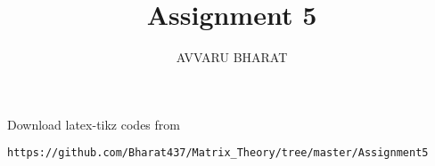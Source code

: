 \documentclass[journal,12pt,twocolumn]{IEEEtran}
\DeclareMathOperator*{\Res}{Res}
\begin{document}
\newtheorem{theorem}{Theorem}[section]
\newtheorem{problem}{Problem}
\newtheorem{proposition}{Proposition}[section]
\newtheorem{lemma}{Lemma}[section]
\newtheorem{corollary}[theorem]{Corollary}
\newtheorem{example}{Example}[section]
\newtheorem{definition}[problem]{Definition}

\newcommand{\BEQA}{\begin{eqnarray}}
\newcommand{\EEQA}{\end{eqnarray}}
\newcommand{\define}{\stackrel{\triangle}{=}}

\providecommand{\mbf}{\mathbf}
\providecommand{\pr}[1]{\ensuremath{\Pr\left(#1\right)}}
\providecommand{\qfunc}[1]{\ensuremath{Q\left(#1\right)}}
\providecommand{\sbrak}[1]{\ensuremath{{}\left[#1\right]}}
\providecommand{\lsbrak}[1]{\ensuremath{{}\left[#1\right.}}
\providecommand{\rsbrak}[1]{\ensuremath{{}\left.#1\right]}}
\providecommand{\brak}[1]{\ensuremath{\left(#1\right)}}
\providecommand{\lbrak}[1]{\ensuremath{\left(#1\right.}}
\providecommand{\rbrak}[1]{\ensuremath{\left.#1\right)}}
\providecommand{\cbrak}[1]{\ensuremath{\left\{#1\right\}}}
\providecommand{\lcbrak}[1]{\ensuremath{\left\{#1\right.}}
\providecommand{\rcbrak}[1]{\ensuremath{\left.#1\right\}}}
\theoremstyle{remark}
\newtheorem{rem}{Remark}
\newcommand{\sgn}{\mathop{\mathrm{sgn}}}
\providecommand{\abs}[1]{\left\vert#1\right\vert}
\providecommand{\res}[1]{\Res\displaylimits_{#1}} 
\providecommand{\norm}[1]{\left\lVert#1\right\rVert}
\providecommand{\mtx}[1]{\mathbf{#1}}
\providecommand{\mean}[1]{E\left[ #1 \right]}
\providecommand{\fourier}{\overset{\mathcal{F}}{ \rightleftharpoons}}
\providecommand{\system}{\overset{\mathcal{H}}{ \longleftrightarrow}}
\newcommand{\solution}{\noindent \textbf{Solution: }}
\newcommand{\cosec}{\,\text{cosec}\,}
\providecommand{\dec}[2]{\ensuremath{\overset{#1}{\underset{#2}{\gtrless}}}}
\newcommand{\myvec}[1]{\ensuremath{\begin{pmatrix}#1\end{pmatrix}}}
\newcommand{\mydet}[1]{\ensuremath{\begin{vmatrix}#1\end{vmatrix}}}
\makeatletter
{}
\makeatother
\let\StandardTheFigure\thefigure
\let\vec\mathbf
\renewcommand{\thefigure}{\theproblem}
\def\putbox#1#2#3{\makebox[0in][l]{\makebox[#1][l]{}\raisebox{\baselineskip}[0in][0in]{\raisebox{#2}[0in][0in]{#3}}}}
     \def\rightbox#1{\makebox[0in][r]{#1}}
     \def\centbox#1{\makebox[0in]{#1}}
     \def\topbox#1{\raisebox{-\baselineskip}[0in][0in]{#1}}
     \def\midbox#1{\raisebox{-0.5\baselineskip}[0in][0in]{#1}}
\vspace{3cm}
\title{Assignment 5}
\author{AVVARU BHARAT}
\maketitle
\newpage
\bigskip
\renewcommand{\thefigure}{\theenumi}
\renewcommand{\thetable}{\theenumi}
Download latex-tikz codes from 
%
\begin{lstlisting}
https://github.com/Bharat437/Matrix_Theory/tree/master/Assignment5
\end{lstlisting}
\end{document}
